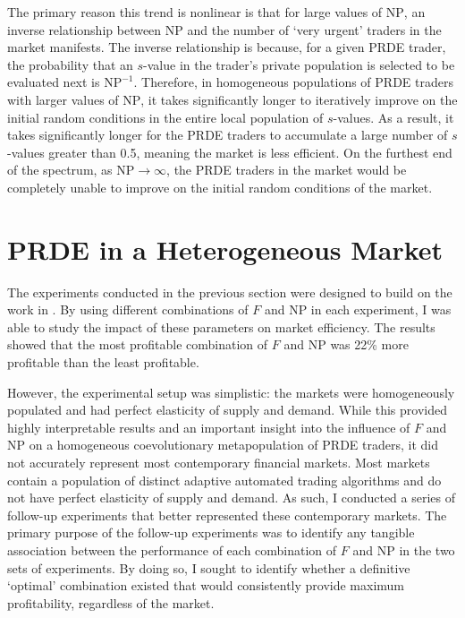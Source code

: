 \documentclass[conference]{IEEEtran}
\begin{document}
The primary reason this trend is nonlinear is that for large values of $\mathrm{NP}$, an inverse relationship between $\mathrm{NP}$ and the number of `very urgent' traders in the market manifests.
The inverse relationship is because, for a given PRDE trader, the probability that an $s$-value in the trader's private population is selected to be evaluated next is $\mathrm{NP}^{-1}$.
Therefore, in homogeneous populations of PRDE traders with larger values of $\mathrm{NP}$, it takes significantly longer to iteratively improve on the initial random conditions in the entire local population of $s$-values.
As a result, it takes significantly longer for the PRDE traders to accumulate a large number of $s$-values greater than 0.5, meaning the market is less efficient.
On the furthest end of the spectrum, as $\mathrm{NP}\to\infty$, the PRDE traders in the market would be completely unable to improve on the initial random conditions of the market.

\section{PRDE in a Heterogeneous Market}

The experiments conducted in the previous section were designed to build on the work in \cite{PRDE}.
By using different combinations of $F$ and $\mathrm{NP}$ in each experiment, I was able to study the impact of these parameters on market efficiency.
The results showed that the most profitable combination of $F$ and $\mathrm{NP}$ was 22\% more profitable than the least profitable.

However, the experimental setup was simplistic: the markets were homogeneously populated and had perfect elasticity of supply and demand.
While this provided highly interpretable results and an important insight into the influence of $F$ and $\mathrm{NP}$ on a homogeneous coevolutionary metapopulation of PRDE traders, it did not accurately represent most contemporary financial markets.
Most markets contain a population of distinct adaptive automated trading algorithms and do not have perfect elasticity of supply and demand.
As such, I conducted a series of follow-up experiments that better represented these contemporary markets. 
The primary purpose of the follow-up experiments was to identify any tangible association between the performance of each combination of $F$ and $\mathrm{NP}$ in the two sets of experiments.
By doing so, I sought to identify whether a definitive `optimal' combination existed that would consistently provide maximum profitability, regardless of the market.
\end{document}
